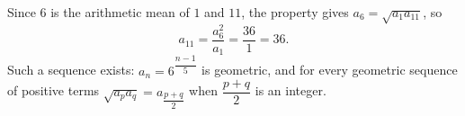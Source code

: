 Since $6$ is the arithmetic mean of $1$ and $11$, the property gives $a_6=\sqrt{a_1a_{11}}$, so
\[
a_{11}=\dfrac{a_6^2}{a_1}=\dfrac{36}{1}=\boxed{36}.
\]
Such a sequence exists: $a_n=6^{\dfrac{n-1}{5}}$ is geometric, and for every geometric sequence of positive terms $\sqrt{a_pa_q}=a_{\dfrac{p+q}{2}}$ when $\dfrac{p+q}{2}$ is an integer.
